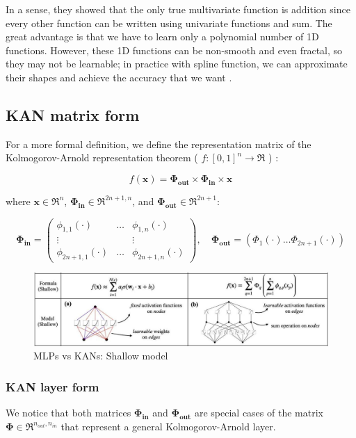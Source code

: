In a sense, they showed that the only true multivariate function is addition since every other function can be written using univariate functions and sum. The great advantage is that we have to learn only a polynomial number of 1D functions. However, these 1D functions can be non-smooth and even fractal, so they may not be learnable; in practice with spline function, we can approximate their shapes and achieve the accuracy that we want \cite{KAN}.

\subsection{KAN matrix form}
\label{sec:ma}
For a more formal definition, we define the representation matrix of the Kolmogorov-Arnold representation theorem ( $f: [0,1]^n \rightarrow \Re$ ) \cite{KAN}:

$$f(\textbf{x}) = \boldsymbol{\Phi_{out}} \times \boldsymbol{\Phi_{in} }\times \textbf{x}$$

where $\textbf{x} \in \Re^n$, $\boldsymbol{\Phi_{in}} \in \Re^{2n+1,n}$, and $\boldsymbol{\Phi_{out}} \in \Re^{2n+1}$:

\[
\boldsymbol{\Phi_{in}} = 
\begin{pmatrix}
\phi_{1,1}(\cdot) & \dots & \phi_{1,n}(\cdot) \\
\vdots &   & \vdots \\
\phi_{2n+1,1}(\cdot) & \dots & \phi_{2n+1,n}(\cdot)
\end{pmatrix},
\quad \boldsymbol{\Phi_{out}} = (\Phi_{1}(\cdot) \dots \Phi_{2n+1}(\cdot))
\]

\begin{figure}[H]
    \centering
    \includegraphics[width=0.8\linewidth]{Images/A.JPG}
    \caption{ MLPs vs KANs: Shallow model}
\end{figure}

\subsubsection{KAN layer form}
We notice that both matrices $\boldsymbol{\Phi_{in}}$ and $\boldsymbol{\Phi_{out}}$ are special cases of the matrix $\boldsymbol{\Phi} \in \Re^{n_{out},n_{in}}$ that represent a general Kolmogorov-Arnold layer. 

